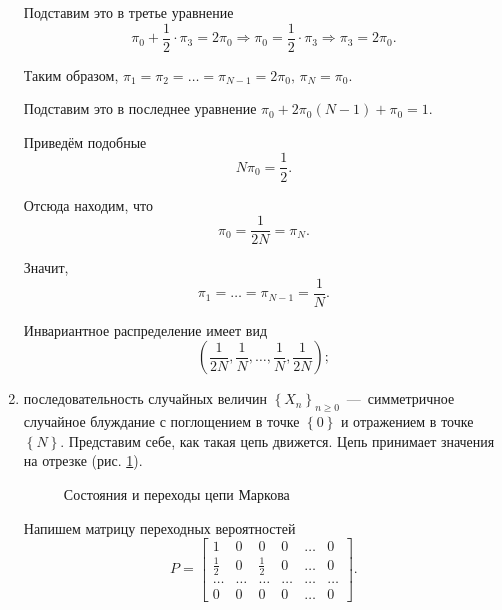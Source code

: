 \begin{enumerate}[label=\alph*)]
  Подставим это в третье уравнение
  \begin{equation*}
    \pi_0 + \frac{1}{2} \cdot \pi_3 = 2 \pi_0 \Rightarrow
    \pi_0 = \frac{1}{2} \cdot \pi_3 \Rightarrow
    \pi_3 = 2 \pi_0.
  \end{equation*}

  Таким образом, $ \pi_1 = \pi_2 = \dotsc = \pi_{N - 1} = 2 \pi_0, \, \pi_N = \pi_0$.

  Подставим это в последнее уравнение $ \pi_0 + 2 \pi_0 \left( N - 1 \right) + \pi_0 = 1$.

  Приведём подобные
  \begin{equation*}
    N \pi_0 = \frac{1}{2}.
  \end{equation*}

  Отсюда находим, что
  \begin{equation*}
    \pi_0 =
    \frac{1}{2N} =
    \pi_N.
  \end{equation*}

  Значит,
  \begin{equation*}
    \pi_1 =
    \dotsc =
    \pi_{N - 1} =
    \frac{1}{N}.
  \end{equation*}

  Инвариантное распределение имеет вид
  \begin{equation*}
    \left( \frac{1}{2N}, \frac{1}{N}, \dotsc, \frac{1}{N}, \frac{1}{2N} \right);
  \end{equation*}
  \item последовательность случайных величин
  $ \left\{ X_n \right\}_{n \geq 0}$~---~симметричное случайное блуждание с поглощением в точке
  $ \left\{ 0 \right\} $ и отражением в точке $ \left\{ N \right\} $.
  Представим себе, как такая цепь движется.
  Цепь принимает значения на отрезке (рис. \ref{fig:15131}).

  \begin{figure}[h]
    \centering
    
    \caption{Состояния и переходы цепи Маркова}
    \label{fig:15131}
  \end{figure}

  Напишем матрицу переходных вероятностей
  \begin{equation*}
    P =
    \begin{bmatrix}
      1 & 0 & 0 & 0 & \dotsc & 0 \\
      \frac{1}{2} & 0 & \frac{1}{2} & 0 & \dotsc & 0 \\
      \dotsc & \dotsc & \dotsc & \dotsc & \dotsc & \dotsc \\
      0 & 0 & 0 & 0 & \dotsc & 0
    \end{bmatrix}.
  \end{equation*}


\end{enumerate}
